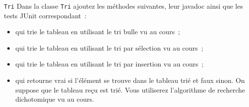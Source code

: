 \documentclass[a4paper,11pt]{article}
\begin{document}
	\begin{Exercice}{\texttt{Tri}}	
		Dans la classe \texttt{Tri} ajoutez les méthodes suivantes, leur
		 javadoc ainsi que les tests JUnit correspondant~:
		\begin{itemize}
			\item {} 
				qui trie le tableau en utilisant le tri bulle vu au cours~;
			\item {} 
				qui trie le tableau en utilisant le tri par sélection vu au cours~;
			\item {} 
				qui trie le tableau en utilisant le tri par insertion vu au cours~;
			\item {} 
				qui retourne vrai si l'élément se trouve dans le tableau trié et 
				faux sinon. On suppose que le tableau reçu est trié. Vous utiliserez
				l'algorithme de recherche dichotomique vu au cours.

		\end{itemize}
	\end{Exercice}



\end{document}
